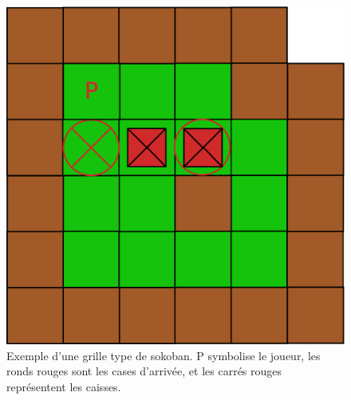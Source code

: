 \documentclass[10pt,a4paper]{article}
\begin{document}
\begin{figure}[!h]
	\centering
	\includegraphics[scale=0.2]{Diagram1.eps}  
	\caption{
			Exemple d'une grille type de sokoban. P symbolise le joueur, les ronds rouges sont les cases d'arrivée, et les carrés rouges représentent les caisses.
	}
	\label{label-figure1}
\end{figure}
\end{document}
